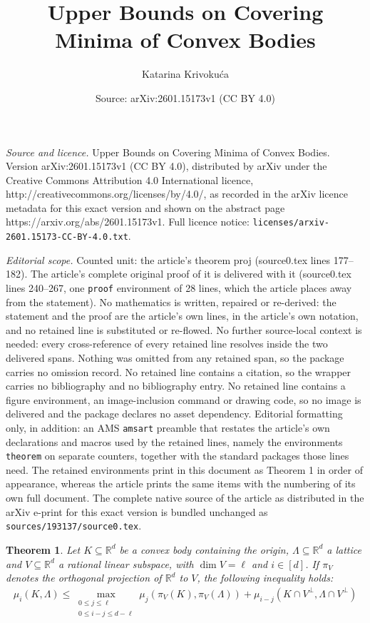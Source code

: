 \documentclass[10pt,a4paper]{amsart}
\title{Upper Bounds on Covering Minima of Convex Bodies}
\author{Katarina Krivoku\'ca}
\date{Source: arXiv:2601.15173v1 (CC BY 4.0)}
\newtheorem{theorem}{Theorem}
\newcommand{\R}{\mathbb{R}}
\begin{document}
\maketitle

\noindent\emph{Source and licence.} Upper Bounds on Covering Minima of Convex Bodies. Version arXiv:2601.15173v1 (CC BY 4.0), distributed by arXiv under the Creative Commons Attribution 4.0 International licence, http://creativecommons.org/licenses/by/4.0/, as recorded in the arXiv licence metadata for this exact version and shown on the abstract page https://arxiv.org/abs/2601.15173v1. Full licence notice: \texttt{licenses/arxiv-2601.15173-CC-BY-4.0.txt}.\par\smallskip

\noindent\textit{Editorial scope.} Counted unit: the article's theorem proj (source0.tex lines 177--182). The article's complete original proof of it is delivered with it (source0.tex lines 240--267, one \texttt{proof} environment of 28 lines, which the article places away from the statement). No mathematics is written, repaired or re-derived: the statement and the proof are the article's own lines, in the article's own notation, and no retained line is substituted or re-flowed.  No further source-local context is needed: every cross-reference of every retained line resolves inside the two delivered spans.  Nothing was omitted from any retained span, so the package carries no omission record.  No retained line contains a citation, so the wrapper carries no bibliography and no bibliography entry.  No retained line contains a figure environment, an image-inclusion command or drawing code, so no image is delivered and the package declares no asset dependency.  Editorial formatting only, in addition: an AMS \texttt{amsart} preamble that restates the article's own declarations and macros used by the retained lines, namely the environments \texttt{theorem} on separate counters, together with the standard packages those lines need.  The retained environments print in this document as Theorem 1 in order of appearance, whereas the article prints the same items with the numbering of its own full document.  The complete native source of the article as distributed in the arXiv e-print for this exact version is bundled unchanged as \texttt{sources/193137/source0.tex}.
\begin{theorem}\label{thm: ub proj}
Let $K\subseteq\R^d$ be a convex body containing the origin, $\Lambda\subseteq \R^d$ a lattice and $V\subseteq \R^d$ a rational linear subspace, with $\dim V=\ell$ and $i\in[d]$. If $\pi_V$ denotes the orthogonal projection of $\R^d$ to $V$, the following inequality holds:
\begin{align}\label{eq:ub proj}
\mu_i(K, \Lambda)\leqslant \max_{\substack{0 \le j \le \ell \\ 0 \le i-j \le d-\ell}} \mu_j(\pi_V(K), \pi_V(\Lambda))+ \mu_{i-j}(K\cap V^\perp, \Lambda \cap V^\perp)
\end{align}
\end{theorem}
\end{document}
